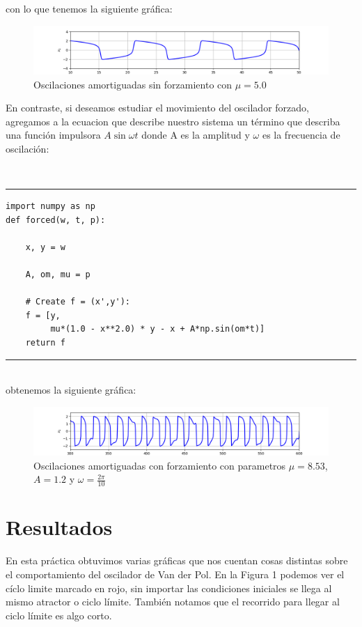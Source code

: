\documentclass{article}
\begin{document}
con lo que tenemos la siguiente gráfica:
\begin{figure}[ht!]
\centering
\includegraphics[width=\linewidth]{fig1.png}
\caption{Oscilaciones amortiguadas sin forzamiento con $\mu=5.0$}
\end{figure}

\newpage

En contraste, si deseamos estudiar el movimiento del oscilador forzado, agregamos a la ecuacion que describe nuestro sistema un término que describa una función impulsora $A\sin\omega t$ donde A es la amplitud y $\omega$ es la frecuencia de oscilación:

~\\
\hrule
\begin{verbatim}
import numpy as np
def forced(w, t, p):
    
    x, y = w
    
    A, om, mu = p

    # Create f = (x',y'):
    f = [y,
         mu*(1.0 - x**2.0) * y - x + A*np.sin(om*t)]
    return f
\end{verbatim}
\hrule
~\\

obtenemos la siguiente gráfica:
\begin{figure}[ht!]
\centering
\includegraphics[width=\linewidth]{fig4.png}
\caption{Oscilaciones amortiguadas con forzamiento con parametros $\mu=8.53$, $A=1.2$ y $\omega=\frac{2\pi}{10}$}
\end{figure}

\section{Resultados}

En esta práctica obtuvimos varias gráficas que nos cuentan cosas distintas sobre el comportamiento del oscilador de Van der Pol.
En la Figura 1 podemos ver el cíclo limite marcado en rojo, sin importar las condiciones iniciales se llega al mismo atractor o ciclo límite. También notamos que el recorrido para llegar al ciclo límite es algo corto.
\end{document}

